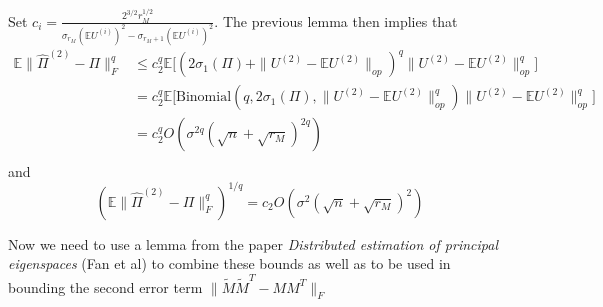 \documentclass[notheorems]{beamer}
\theoremstyle{definition}
\begin{document}
\begin{frame}
Set $c_i = \frac{2^{3/2}r_M^{1/2}}{\sigma_{r_M}(\mathbb{E}U^{(i)})^2 - \sigma_{r_M + 1}(\mathbb{E}U^{(i)})^2}$. The previous lemma then implies that
\begin{align*}
    \mathbb{E}\|\hat{\Pi}^{(2)} - \Pi \|_F^q
    &\leq c_2^q \mathbb{E}\bigg[ (2 \sigma_1(\Pi) +  \|U^{(2)} - \mathbb{E}U^{(2)}\|_{op})^q \|U^{(2)} - \mathbb{E}U^{(2)}\|_{op}^q \bigg] \\
    &= c_2^q \mathbb{E}\bigg[\text{Binomial}(q, 2 \sigma_1(\Pi), \|U^{(2)} - \mathbb{E}U^{(2)}\|_{op}^{q} ) \|U^{(2)} - \mathbb{E}U^{(2)}\|_{op}^{q}  \bigg]\\
    &= c_2^q O(\sigma^{2q}(\sqrt{n} + \sqrt{r_M})^{2q})\\
\end{align*}
and 
$$(\mathbb{E}\|\hat{\Pi}^{(2)} - \Pi \|_F^q)^{1/q} = c_2 O(\sigma^2 (\sqrt{n} + \sqrt{r_M})^2)$$
\end{frame}















\begin{frame}
Now we need to use a lemma from the paper \emph{Distributed estimation of principal eigenspaces} (Fan et al) to combine these bounds as well as to be used in bounding the second error term $\|\tilde{M}\tilde{M}^T - MM^T\|_F$ 
\end{frame}
\end{document}
